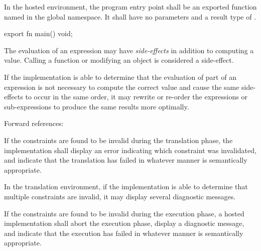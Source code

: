 
\specsubsubitem
In the hosted environment, the program entry point shall be an exported
function named  in the global namespace. It shall have no parameters
and a result type of .


\begin{codesample}
export fn main() void;
\end{codesample}



\specsubsubitem
The evaluation of an expression may have \textit{side-effects} in addition to
computing a value. Calling a function or modifying an object is considered a
side-effect.

\specsubsubitem
If the implementation is able to determine that the evaluation of part of an
expression is not necessary to compute the correct value and cause the same
side-effects to occur in the same order, it may rewrite or re-order the
expressions or sub-expressions to produce the same results more optimally.


Forward references: 


\specsubitem
If the constraints are found to be invalid during the translation phase, the
implementation shall display an error indicating which constraint was
invalidated, and indicate that the translation has failed in whatever manner is
semantically appropriate.


\specsubitem
In the translation environment, if the implementation is able to determine that
multiple constraints are invalid, it may display several diagnostic messages.

\specsubitem
If the constraints are found to be invalid during the execution phase, a hosted
implementation shall abort the execution phase, display a diagnostic message,
and indicate that the execution has failed in whatever manner is semantically
appropriate.
